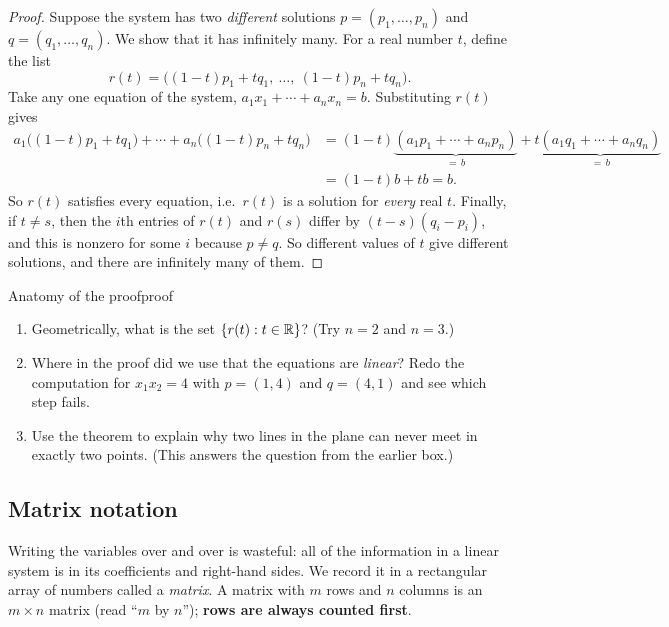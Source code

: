 \documentclass[11pt]{article}
\begin{document}
\begin{proof}
Suppose the system has two \emph{different} solutions $p=(p_1,\dots,p_n)$ and
$q=(q_1,\dots,q_n)$. We show that it has infinitely many.
For a real number $t$, define the list
\[
r(t)=\bigl((1-t)p_1+tq_1,\ \dots,\ (1-t)p_n+tq_n\bigr).
\]
Take any one equation of the system, $a_1x_1+\cdots+a_nx_n=b$. Substituting $r(t)$ gives
\begin{align*}
a_1\bigl((1-t)p_1+tq_1\bigr)+\cdots+a_n\bigl((1-t)p_n+tq_n\bigr)
&=(1-t)\underbrace{(a_1p_1+\cdots+a_np_n)}_{=\,b}+t\underbrace{(a_1q_1+\cdots+a_nq_n)}_{=\,b}\\
&=(1-t)b+tb=b.
\end{align*}
So $r(t)$ satisfies every equation, i.e.\ $r(t)$ is a solution for \emph{every} real $t$.
Finally, if $t\ne s$, then the $i$th entries of $r(t)$ and $r(s)$ differ by $(t-s)(q_i-p_i)$, and
this is nonzero for some $i$ because $p\ne q$. So different values of $t$ give different
solutions, and there are infinitely many of them.
\end{proof}
 
\begin{think}{Anatomy of the proof}{proof}
\begin{enumerate}[label=(\arabic*)]
  \item Geometrically, what is the set $\{r(t): t\in\mathbb{R}\}$? (Try $n=2$ and $n=3$.)
  \item Where in the proof did we use that the equations are \emph{linear}? Redo the
        computation for $x_1x_2=4$ with $p=(1,4)$ and $q=(4,1)$ and see which step fails.
  \item Use the theorem to explain why two lines in the plane can never meet in exactly two
        points. (This answers the question from the earlier box.)
\end{enumerate}
\end{think}
 
\subsection*{Matrix notation}
 
Writing the variables over and over is wasteful: all of the information in a linear system is
in its coefficients and right-hand sides. We record it in a rectangular array of numbers called a
\emph{matrix}. A matrix with $m$ rows and $n$ columns is an $m\times n$ matrix
(read ``$m$ by $n$''); \textbf{rows are always counted first}.
 
\end{document}
